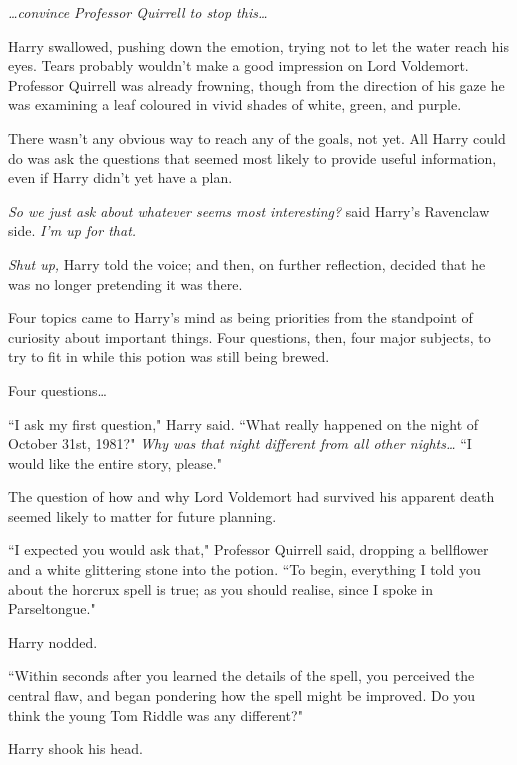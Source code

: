 \emph{…convince Professor Quirrell to \emph{stop this…}}

Harry swallowed, pushing down the emotion, trying not to let the water reach his eyes. Tears probably wouldn't make a good impression on Lord Voldemort. Professor Quirrell was already frowning, though from the direction of his gaze he was examining a leaf coloured in vivid shades of white, green, and purple.

There wasn't any obvious way to reach any of the goals, not yet. All Harry could do was ask the questions that seemed most likely to provide useful information, even if Harry didn't yet have a plan.

\emph{So we just ask about whatever seems most interesting?} said Harry's Ravenclaw side. \emph{I'm up for that.}

\emph{Shut up,} Harry told the voice; and then, on further reflection, decided that he was no longer pretending it was there.

Four topics came to Harry's mind as being priorities from the standpoint of curiosity about important things. Four questions, then, four major subjects, to try to fit in while this potion was still being brewed.

Four questions…

``I ask my first question," Harry said. ``What really happened on the night of October 31st, 1981?" \emph{Why was that night different from all other nights…} ``I would like the entire story, please."

The question of how and why Lord Voldemort had survived his apparent death seemed likely to matter for future planning.

``I expected you would ask that," Professor Quirrell said, dropping a bellflower and a white glittering stone into the potion. ``To begin, everything I told you about the horcrux spell is true; as you should realise, since I spoke in Parseltongue."

Harry nodded.

``Within seconds after you learned the details of the spell, you perceived the central flaw, and began pondering how the spell might be improved. Do you think the young Tom Riddle was any different?"

Harry shook his head.

